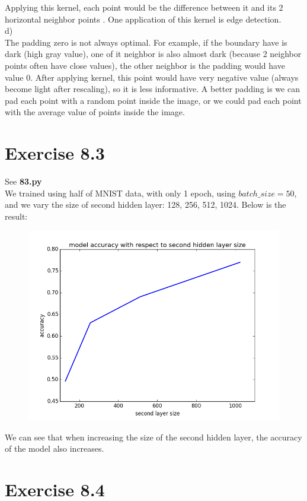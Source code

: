 \documentclass{article}
\begin{document}
Applying this kernel, each point would be the difference between it and its 2 horizontal neighbor points . One application of this kernel is edge detection.\\
d)\\
The padding zero is not always optimal. For example, if the boundary have is dark (high gray value), one of it neighbor is also almost dark (because 2 neighbor points often have close values), the other neighbor is the padding would have value 0. After applying kernel, this point would have very negative value (always become light after rescaling), so it is less informative. A better padding is we can pad each point with a random point inside the image, or we could pad each point with the average value of points inside the image.
\newpage
\section*{Exercise 8.3}
See \textbf{83.py}\\
We trained using half of MNIST data, with only 1 epoch, using $batch\_size = 50$, and we vary the size of second hidden layer: 128, 256, 512, 1024. Below is the result:
\begin{figure}[ht]
\centering
\includegraphics[scale=0.5]{83.png}
\end{figure}

We can see that when increasing the size of the second hidden layer, the accuracy of the model also increases.
\section*{Exercise 8.4}
\end{document}
